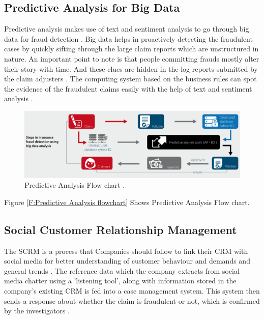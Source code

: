 \documentclass[sigconf]{acmart}
\begin{document}
\subsection{Predictive Analysis for Big Data}
Predictive analysis makes use of text and sentiment analysis to go through big data for fraud detection \cite{link9}. Big data helps in proactively detecting the fraudulent cases by quickly sifting through the large claim reports which are unstructured in nature. An important point to note is that people committing frauds mostly alter their story with time. And these clues are hidden in the log reports submitted by the claim adjusters \cite{link7}. The computing system based on the business rules can spot the evidence of the fraudulent claims easily with the help of text and sentiment analysis \cite{link9}.

\begin{figure}
  \includegraphics[width=\linewidth]{images/predictive_image1.png}
  \caption{Predictive Analysis Flow chart \cite{link7}.}
  \label{F: Predictive Analysis flowchart}
\end{figure}
Figure \ref{F:Predictive Analysis flowchart} Shows Predictive Analysis Flow chart.\\

\subsection{Social Customer Relationship Management}
The SCRM is a process that Companies should follow to link their CRM with social media for better understanding of customer behaviour and demands and general trends \cite{link9}. The reference data which the company extracts from social media chatter using a 'listening tool', along with information stored in the company's existing CRM is fed into a case management system. This system then sends a response about whether the claim is fraudulent or not, which is confirmed by the investigators \cite{link7}.
\end{document}
